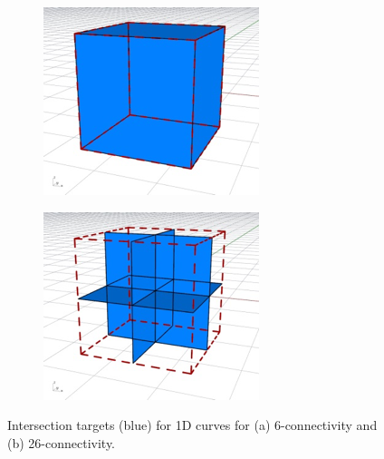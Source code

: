 \begin{figure}
\centering
\begin{subfigure}[b]{0.45\linewidth}
\includegraphics[width=\linewidth]{figs/1d6}
\caption{}%
\label{subfig:1d6}
\end{subfigure}
\quad
\begin{subfigure}[b]{0.45\linewidth}
\includegraphics[width=\linewidth]{figs/1d26}
\caption{}%
\label{subfig:1d26}
\end{subfigure}
\caption{Intersection targets (blue) for 1D curves for (a) 6-connectivity and (b) 26-connectivity.}%
\label{fig:1d}
\end{figure}

